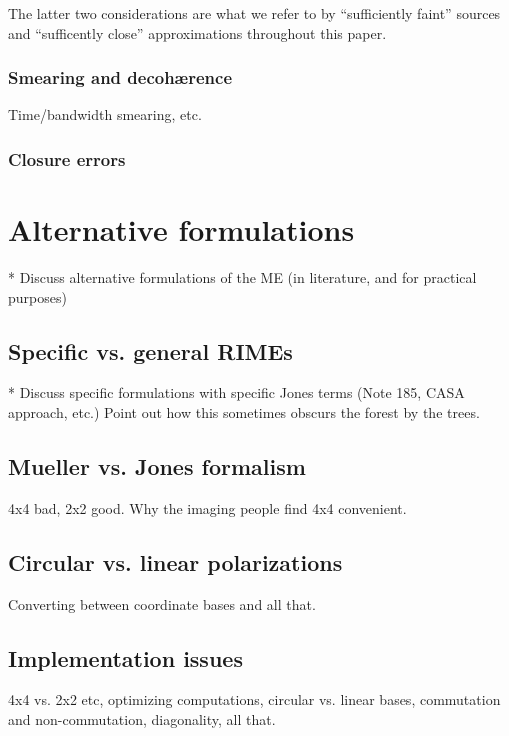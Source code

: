 \documentclass[]{aa}
\begin{document}
The latter two considerations are what we refer to by ``sufficiently faint'' sources and ``sufficently close'' approximations throughout this paper.

\subsubsection{\label{sec:smearing}Smearing and decoh{\ae}rence}

Time/bandwidth smearing, etc.

\subsubsection{\label{sec:closure-errors}Closure errors}

\section{\label{sec:formulations}Alternative formulations}

* Discuss alternative formulations of the ME (in literature, and for practical purposes)

\subsection{Specific vs. general RIMEs} 

* Discuss specific formulations with specific Jones terms (Note 185, CASA approach, etc.) Point out how this sometimes obscurs the forest by the trees.

\subsection{Mueller vs. Jones formalism}

4x4 bad, 2x2 good. Why the imaging people find 4x4 convenient.

\subsection{\label{sec:circular}Circular vs. linear polarizations}

Converting between coordinate bases and all that.

\subsection{Implementation issues}

4x4 vs. 2x2 etc, optimizing computations, circular vs. linear bases, commutation and non-commutation, diagonality, all that.
\end{document}
